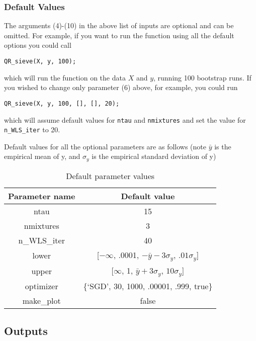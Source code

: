\documentclass[12pt]{article}
\begin{document}
\subsubsection{Default Values}

The arguments (4)-(10) in the above list of inputs are optional and can be omitted. For example, if you want to run the function using all the default options you could call

\begin{lstlisting}[backgroundcolor = \color{codeyellow}]
QR_sieve(X, y, 100);
\end{lstlisting}

which will run the function on the data $X$ and $y$, running 100 bootstrap runs. If you wished to change only parameter (6) above, for example, you could run

\begin{lstlisting}[backgroundcolor = \color{codeyellow}]
QR_sieve(X, y, 100, [], [], 20);
\end{lstlisting}

which will assume default values for \lstinline{ntau} and \lstinline{nmixtures} and set the value for \lstinline{n_WLS_iter} to 20.

Default values for all the optional parameters are as follows (note $\bar{y}$ is the empirical mean of y, and $\sigma_y$ is the empirical standard deviation of y)

\begin{table}[h!]
\centering
\begin{tabular}{||c | c||}
    \hline
    Parameter name & Default value \\
    \hline
    ntau & 15 \\
    nmixtures & 3 \\
    n\_WLS\_iter & 40 \\
    lower & [$-\infty$, .0001, $-\bar{y} - 3\sigma_y$, $.01\sigma_y$]\\
    upper & [$\infty$, 1, $\bar{y} + 3\sigma_y$, $10\sigma_y$]\\
    optimizer & \{`SGD', 30, 1000, .00001, .999, true\}\\
    make\_plot & false \\
    \hline
\end{tabular}
\caption{Default parameter values}
\label{table:1}
\end{table}

\subsection{Outputs}
\end{document}
